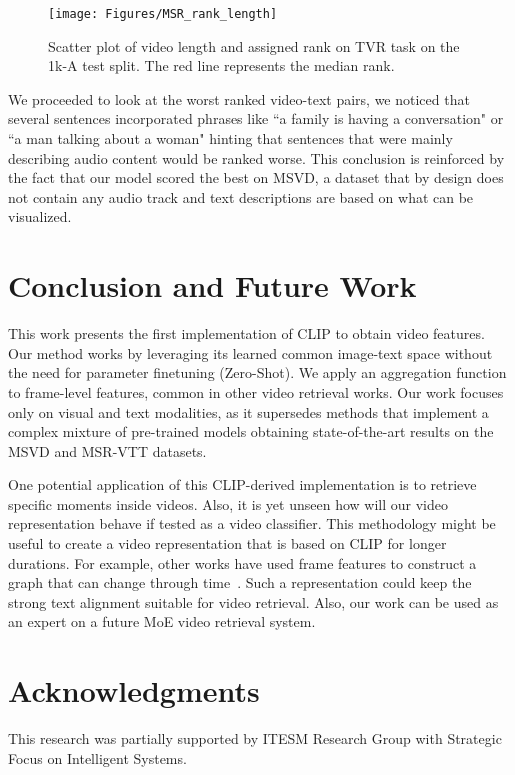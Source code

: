 \documentclass[a4paper,runningheads]{llncs}
\begin{document}
\begin{figure}[ht!]
    \centering
    \texttt{[image: Figures/MSR\_rank\_length]}
    \caption{Scatter plot of video length and assigned rank on TVR task on the 1k-A test split. The red line represents the median rank.}
    \label{fig:ScatterPlot}
\end{figure}

We proceeded to look at the worst ranked video-text pairs, we noticed that several sentences incorporated phrases like ``a family is having a conversation" or ``a man talking about a woman" hinting that sentences that were mainly describing audio content would be ranked worse. This conclusion is reinforced by the fact that our model scored the best on MSVD, a dataset that by design does not contain any audio track and text descriptions are based on what can be visualized.

\section{Conclusion and Future Work}
\label{sec:Conclusion}

This work presents the first implementation of CLIP to obtain video features. Our method works by leveraging its learned common image-text space without the need for parameter finetuning (Zero-Shot). We apply an aggregation function to frame-level features, common in other video retrieval works. Our work focuses only on visual and text modalities,
as it supersedes methods that implement a complex mixture of pre-trained models obtaining state-of-the-art results on the MSVD and MSR-VTT datasets. 

One potential application of this CLIP-derived implementation is to retrieve specific moments inside videos. Also, it is yet unseen how will our video representation behave if tested as a video classifier. This methodology might be useful to create a video representation that is based on CLIP for longer durations. For example, other works have used frame features to construct a graph that can change through time~\cite{mao2018hierarchical}. Such a representation could keep the strong text alignment suitable for video retrieval. Also, our work can be used as an expert on a future MoE video retrieval system.

\section*{Acknowledgments}

This research was partially supported by ITESM Research Group with Strategic Focus on Intelligent Systems.



\end{document}
